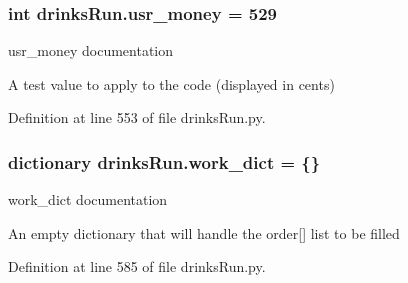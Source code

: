 \hypertarget{namespacedrinksRun_a1175911b84c3ff7a59eaf99936e7ce0b}{
\subsubsection[{usr\-\_\-money}]{\setlength{\rightskip}{0pt plus 5cm}int drinks\-Run.\-usr\-\_\-money = 529}}\label{namespacedrinksRun_a1175911b84c3ff7a59eaf99936e7ce0b}


usr\-\_\-money documentation 

A test value to apply to the code (displayed in cents) 

Definition at line 553 of file drinks\-Run.\-py.

\hypertarget{namespacedrinksRun_aec482d659ba637a7a2a286f3398f7c31}{
\subsubsection[{work\-\_\-dict}]{\setlength{\rightskip}{0pt plus 5cm}dictionary drinks\-Run.\-work\-\_\-dict = \{\}}}\label{namespacedrinksRun_aec482d659ba637a7a2a286f3398f7c31}


work\-\_\-dict documentation 

An empty dictionary that will handle the order\mbox{[}\mbox{]} list to be filled 

Definition at line 585 of file drinks\-Run.\-py.

